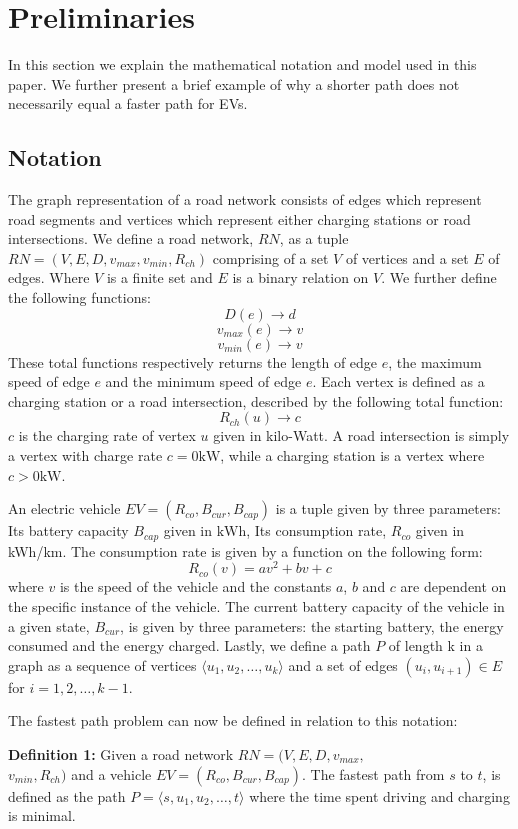 \section{Preliminaries} \label{sec:notation}
In this section we explain the mathematical notation and model used in this paper. We further present a brief example of why a shorter path does not necessarily equal a faster path for EVs. 

\subsection{Notation}
The graph representation of a road network consists of edges which represent road segments and vertices which represent either charging stations or road intersections. We define a road network, $RN$, as a tuple $RN=(V,E,D,v_{max},v_{min},R_{ch})$ comprising of a set $V$ of vertices and a set $E$ of edges. Where $V$ is a finite set and $E$ is a binary relation on $V$. We further define the following functions:
\[ D(e)\rightarrow d \] 
\[ v_{max}(e)\rightarrow v \]
\[ v_{min}(e)\rightarrow v \]
These total functions respectively returns the length of edge $e$, the maximum speed of edge $e$ and the minimum speed of edge $e$. Each vertex is defined as a charging station or a road intersection, described by the following total function:
\[R_{ch}(u)\rightarrow c\]
$c$ is the charging rate of vertex $u$ given in kilo-Watt. A road intersection is simply a vertex with charge rate $c = 0\si{\kW}$, while a charging station is a vertex where $c > 0\si{\kW}$. 

An electric vehicle $EV=(R_{co},B_{cur},B_{cap})$ is a tuple given by three parameters: Its battery capacity $B_{cap}$ given in $\si{\kWh}$, Its consumption rate, $R_{co}$ given in kWh/km. The consumption rate is given by a function on the following form:
\[ R_{co}(v)=av^2+bv+c \]
where $v$ is the speed of the vehicle and the constants $a$, $b$ and $c$ are dependent on the specific instance of the vehicle. The current battery capacity of the vehicle in a given state, $B_{cur}$, is given by three parameters: the starting battery, the energy consumed and the energy charged. Lastly, we define a path $P$ of length k in a graph as a sequence of vertices $\langle u_1,u_2,\dots,u_k \rangle$ and a set of edges $(u_{i},u_{i+1})\in E$ for $i=1,2,\dots,k-1$.

The fastest path problem can now be defined in relation to this notation:

\textbf{Definition 1:} Given a road network $RN=(V,E,D,v_{max},$\\ 
$v_{min},R_{ch})$ and a vehicle $EV=(R_{co},B_{cur},B_{cap})$. The fastest path 
from $s$ to $t$, is defined as the path $P = \langle s,u_1,u_2,\dots,t \rangle$ where the time spent driving and charging is minimal. 
 



